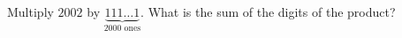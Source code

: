 Multiply $2002$ by $\underbrace{111\ldots1}_{2000\text{ ones}}$. What is the sum of the digits of the product?
